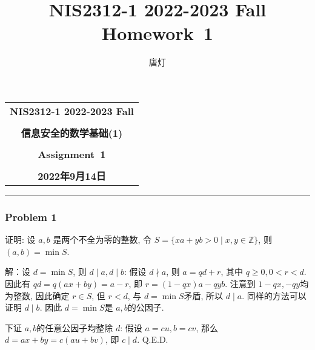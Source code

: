 \documentclass[a4paper,12pt]{ctexart}
\title{NIS2312-1 2022-2023 Fall Homework~1}
\author{唐灯}
\begin{document}
  \begin{center}

  \vspace{-0.3in}
  \begin{tabular}{c}
    \textbf{\Large NIS2312-1 2022-2023 Fall} \\
    \textbf{\Large  } \\
    \textbf{\Large  信息安全的数学基础(1)} \\
    \textbf{\Large  } \\
    \textbf{\Large  Assignment~1} \\
    \textbf{\Large  } \\
    \textbf{\Large 2022年9月14日} \\
  \end{tabular}
  \end{center}
  \noindent
  \rule{\linewidth}{0.4pt}
  
\subsubsection*{Problem 1}
    证明: 设 $ a,b $ 是两个不全为零的整数, 令 $ S=\{xa+yb>0\mid x,y\in\mathbb{Z}\} $, 则 $ (a,b)=\min S $. 

    解：设 $ d=\min S $, 则 $ d\mid a,d\mid b $:  
    假设 $ d\nmid a $, 则 $ a=qd+r $, 其中 $ q\ge 0,0<r<d $. 因此有
    $ qd=q(ax+by)=a-r $, 即 $ r=(1-qx)a-qyb $. 注意到 $ 1-qx,-qy $均为整数, 因此确定 $ r\in S $, 但 $ r<d $, 
    与 $ d=\min S $矛盾, 所以 $ d\mid a $. 同样的方法可以证明 $ d\mid b $. 因此 $ d=\min S $是 $ a,b $的公因子.  
    
    下证 $ a,b $的任意公因子均整除 $ d $: 假设 $ a=cu,b=cv $, 那么 $ d=ax+by=c(au+bv) $, 即 $ c\mid d $. 
    Q.E.D.
\end{document}
